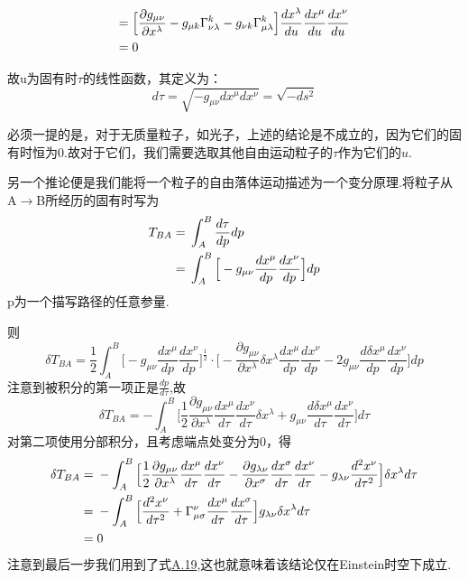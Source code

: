 \documentclass[a4paper]{book}
\begin{document}
\begin{appendix}
\begin{align}
  ={} & \Big[\frac{\partial g_{\mu \nu}}{\partial x^{\lambda}}-g_{\mu k}\Gamma^{k}_{\nu \lambda}-g_{\nu k}\Gamma^{k}_{\mu \lambda}\Big]\frac{dx^{\lambda}}{du}\frac{dx^{\mu}}{du}\frac{dx^{\nu}}{du}\notag \\
  ={} & 0 \notag
\end{align}\par 
故u为固有时$\tau$的线性函数，其定义为：
\begin{equation}
	d\tau=\sqrt{-g_{\mu \nu}dx^{\mu}dx^{\nu}}=\sqrt{-ds^2}
\end{equation}\par 
必须一提的是，对于无质量粒子，如光子，上述的结论是不成立的，因为它们的固有时恒为0.故对于它们，我们需要选取其他自由运动粒子的$\tau$作为它们的$u$.\par 
另一个推论便是我们能将一个粒子的自由落体运动描述为一个变分原理.将粒子从A$\rightarrow$B所经历的固有时写为
\begin{align}
	T_{BA}={}&\int^{B}_{A}\frac{d\tau}{dp}dp \notag \\
	      ={}&\int^{B}_{A}\Big[-g_{\mu \nu}\frac{dx^{\mu}}{dp}\frac{dx^{\nu}}{dp}\Big]dp
\end{align}
p为一个描写路径的任意参量.\par 
则
\begin{equation}
	\delta 	T_{BA}=\frac{1}{2}\int^{B}_{A}\Big[-g_{\mu \nu}\frac{dx^{\mu}}{dp}\frac{dx^{\nu}}{dp}\Big]^{\frac{1}{2}}\cdot \Big[-\frac{\partial g_{\mu \nu}}{\partial x^{\lambda}}\delta x^{\lambda}\frac{dx^{\mu}}{dp}\frac{dx^{\nu}}{dp}-2g_{\mu \nu}\frac{d\delta x^{\mu}}{dp}\frac{dx^{\nu}}{dp}\Big]dp
\end{equation}
注意到被积分的第一项正是$\frac{dp}{d\tau}$,故
\begin{equation}
		\delta 	T_{BA}=-\int^{B}_{A}\Big[\frac{1}{2}\frac{\partial g_{\mu \nu}}{\partial x^{\lambda}}\frac{dx^{\mu}}{d\tau}\frac{dx^{\nu}}{d\tau}\delta x^{\lambda}+g_{\mu \nu}\frac{d\delta x^{\mu}}{d\tau}\frac{dx^{\nu}}{d\tau}\Big]d\tau
\end{equation}
对第二项使用分部积分，且考虑端点处变分为0，得
\begin{align}
	\delta 	T_{BA}={}&-\int^{B}_{A}\Big[\frac{1}{2}\frac{\partial g_{\mu \nu}}{\partial x^{\lambda}}\frac{dx^{\mu}}{d\tau}\frac{dx^{\nu}}{d\tau}-\frac{\partial g_{\lambda \nu}}{\partial x^{\sigma}}\frac{dx^{\sigma}}{d\tau}\frac{dx^{\nu}}{d\tau}-g_{\lambda \nu}\frac{d^{2}x^{\nu}}{d\tau^2}\Big ]\delta x^{\lambda}d\tau \notag\\
	={}&-\int^{B}_{A}\Big[\frac{d^{2}x^{\nu}}{d\tau^2}+\Gamma^{\nu}_{\mu \sigma}\frac{dx^{\mu}}{d\tau}\frac{dx^{\sigma}}{d\tau}\Big ]g_{\lambda \nu}\delta x^{\lambda}d\tau \notag \\
	={}& 0
\end{align}
注意到最后一步我们用到了式\hyperref[A.19]{A.19},这也就意味着该结论仅在Einstein时空下成立.

\end{appendix}
\end{document}
